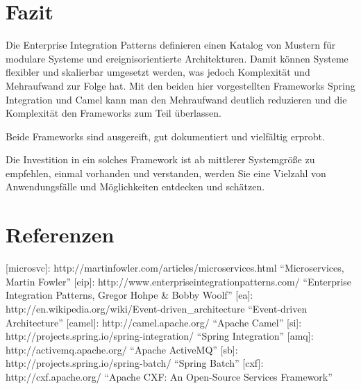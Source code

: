 \documentclass[12pt,a4paper,ngerman]{article}
\begin{document}
\section{Fazit}

Die Enterprise Integration Patterns definieren einen Katalog von Mustern
für modulare Systeme und ereignisorientierte Architekturen. Damit können
Systeme flexibler und skalierbar umgesetzt werden, was jedoch
Komplexität und Mehraufwand zur Folge hat. Mit den beiden hier
vorgestellten Frameworks Spring Integration und Camel kann man den
Mehraufwand deutlich reduzieren und die Komplexität den Frameworks zum
Teil überlassen.

Beide Frameworks sind ausgereift, gut dokumentiert und vielfältig
erprobt.

Die Investition in ein solches Framework ist ab mittlerer Systemgröße zu
empfehlen, einmal vorhanden und verstanden, werden Sie eine Vielzahl von
Anwendungsfälle und Möglichkeiten entdecken und schätzen.

\section{Referenzen}

{[}microsvc{]}: http://martinfowler.com/articles/microservices.html
``Microservices, Martin Fowler'' {[}eip{]}:
http://www.enterpriseintegrationpatterns.com/ ``Enterprise Integration
Patterns, Gregor Hohpe \& Bobby Woolf'' {[}ea{]}:
http://en.wikipedia.org/wiki/Event-driven\_architecture ``Event-driven
Architecture'' {[}camel{]}: http://camel.apache.org/ ``Apache Camel''
{[}si{]}: http://projects.spring.io/spring-integration/ ``Spring
Integration'' {[}amq{]}: http://activemq.apache.org/ ``Apache ActiveMQ''
{[}sb{]}: http://projects.spring.io/spring-batch/ ``Spring Batch''
{[}cxf{]}: http://cxf.apache.org/ ``Apache CXF: An Open-Source Services
Framework''
\end{document}
